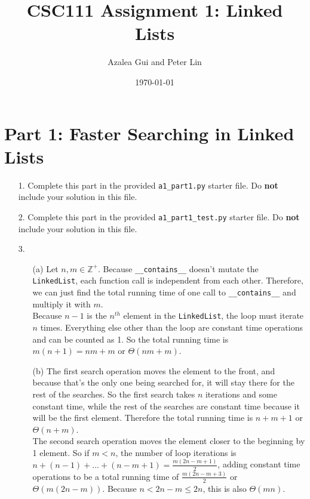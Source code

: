 \documentclass[fontsize=11pt]{article}
\title{CSC111 Assignment 1: Linked Lists}
\author{Azalea Gui and Peter Lin}
\date{\today}
\begin{document}
\maketitle

\section*{Part 1: Faster Searching in Linked Lists}

\begin{enumerate}

\item[1.]
Complete this part in the provided \texttt{a1\_part1.py} starter file.
Do \textbf{not} include your solution in this file.

\item[2.]
Complete this part in the provided \texttt{a1\_part1\_test.py} starter file.
Do \textbf{not} include your solution in this file.

\item[3.]
\begin{enumerate}

    \item[(a)]
    Let $n, m \in \mathbb Z^+$. Because \texttt{\_\_contains\_\_} doesn't mutate the \texttt{LinkedList}, each function call is independent from each other. Therefore, we can just find the total running time of one call to \texttt{\_\_contains\_\_} and multiply it with $m$.\\
    Because $n - 1$ is the $n^{th}$ element in the \texttt{LinkedList}, the loop must iterate $n$ times. Everything else other than the loop are constant time operations and can be counted as 1.
    So the total running time is $m(n + 1) = nm + m$ or $\Theta(nm + m)$.

    \item[(b)]
    The first search operation moves the element to the front, and because that's the only one being searched for, it will stay there for the rest of the searches. So the first search takes $n$ iterations and some constant time, while the rest of the searches are constant time because it will be the first element. Therefore the total running time is $n + m + 1$ or $\Theta(n + m)$.\\

    The second search operation moves the element closer to the beginning by 1 element. So if $m < n$, the number of loop iterations is $n + (n - 1) + ... + (n - m + 1) = \frac{m(2n - m + 1)}{2}$, adding constant time operations to be a total running time of $\frac{m(2n - m + 3)}{2}$ or $\Theta(m(2n - m))$. Because $n < 2n - m \leq 2n$, this is also $\Theta(mn)$.\\


\end{enumerate}
\end{enumerate}
\end{document}
